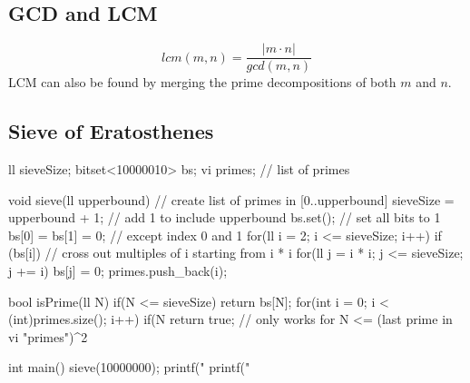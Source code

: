 \documentclass{article}
\begin{document}
\subsection{GCD and LCM}

\[lcm(m,n)=\frac{|m \cdot n|}{gcd(m,n)}\]
LCM can also be found by merging the prime decompositions of both \(m\) and \(n\). 

\subsection{Sieve of Eratosthenes}
\begin{mylisting}{}
ll sieveSize;
bitset<10000010> bs;
vi primes; // list of primes

void sieve(ll upperbound){	// create list of primes in [0..upperbound]
	sieveSize = upperbound + 1;	// add 1 to include upperbound
	bs.set();	// set all bits to 1
	bs[0] = bs[1] = 0;	// except index 0 and 1
	for(ll i = 2; i <= sieveSize; i++) if (bs[i]){
		// cross out multiples of i starting from i * i
		for(ll j = i * i; j <= sieveSize; j += i) bs[j] = 0;
		primes.push_back(i);
}}
	
bool isPrime(ll N){	
	if(N <= sieveSize) return bs[N];
	for(int i = 0; i < (int)primes.size(); i++)
		if(N %
	return true;
}	// only works for N <= (last prime in vi "primes")^2

int main(){
	sieve(10000000);
	printf("%
	printf("%
}
\end{mylisting}
\end{document}
